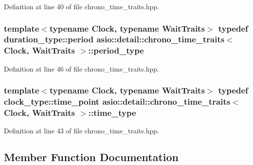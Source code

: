 Definition at line 40 of file chrono\+\_\+time\+\_\+traits.\+hpp.

\hypertarget{structasio_1_1detail_1_1chrono__time__traits_aebb85fcb3beb946b4ea037a411b6d931}{}
\subsubsection[{period\+\_\+type}]{\setlength{\rightskip}{0pt plus 5cm}template$<$typename Clock, typename Wait\+Traits$>$ typedef duration\+\_\+type\+::period {\bf asio\+::detail\+::chrono\+\_\+time\+\_\+traits}$<$ Clock, Wait\+Traits $>$\+::{\bf period\+\_\+type}}\label{structasio_1_1detail_1_1chrono__time__traits_aebb85fcb3beb946b4ea037a411b6d931}


Definition at line 46 of file chrono\+\_\+time\+\_\+traits.\+hpp.

\hypertarget{structasio_1_1detail_1_1chrono__time__traits_a19c14f4d45a8b164d2ea4590eebc1c10}{}
\subsubsection[{time\+\_\+type}]{\setlength{\rightskip}{0pt plus 5cm}template$<$typename Clock, typename Wait\+Traits$>$ typedef clock\+\_\+type\+::time\+\_\+point {\bf asio\+::detail\+::chrono\+\_\+time\+\_\+traits}$<$ Clock, Wait\+Traits $>$\+::{\bf time\+\_\+type}}\label{structasio_1_1detail_1_1chrono__time__traits_a19c14f4d45a8b164d2ea4590eebc1c10}


Definition at line 43 of file chrono\+\_\+time\+\_\+traits.\+hpp.



\subsection{Member Function Documentation}
\hypertarget{structasio_1_1detail_1_1chrono__time__traits_acd393376947e8f72bda0defba4e35929}{}
